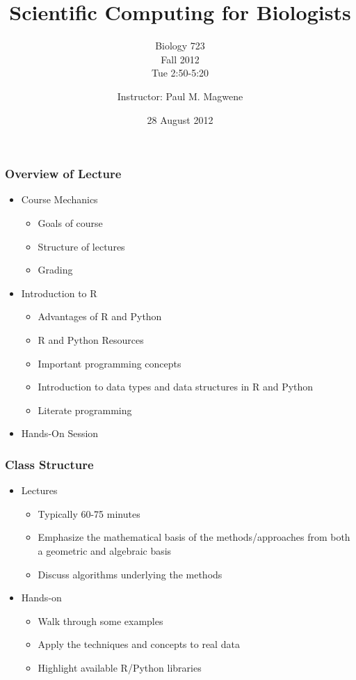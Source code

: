 \documentclass{beamer}
\title{Scientific Computing for Biologists}
\subtitle{Biology 723\\
Fall 2012\\
Tue 2:50-5:20
}
\author[P. Magwene]{Instructor: Paul M. Magwene}
\institute[Bio 723]{
Email: paul.magwene@duke.edu\\
Phone: 613-8159
}
\date{28 August 2012}
\begin{document}
\begin{frame}
\titlepage
\end{frame}

\begin{frame}
  \frametitle{Overview of Lecture}

\begin{itemize}
		\item Course Mechanics
		\begin{itemize}
			\item Goals of course
			\item Structure of lectures
			\item Grading
		\end{itemize}
		\item Introduction to R
		\begin{itemize}
			\item Advantages of R and Python
			\item R and Python Resources
			\item Important programming concepts
			\item Introduction to data types and data structures in R and Python
			\item Literate programming
		\end{itemize}
		\item Hands-On Session
\end{itemize}

\end{frame}


\begin{frame}
  \frametitle{Class Structure}
\begin{itemize}
	\item Lectures

		\begin{itemize}
			\item Typically 60-75 minutes
			\item Emphasize the mathematical basis of the methods/approaches from both a geometric and algebraic basis
			\item Discuss algorithms underlying the methods
		\end{itemize}

	\item Hands-on

			\begin{itemize}
				\item Walk through some examples
				\item Apply the techniques and concepts to real data
				\item Highlight available R/Python libraries
			\end{itemize}

\end{itemize}

\end{frame}
\end{document}
